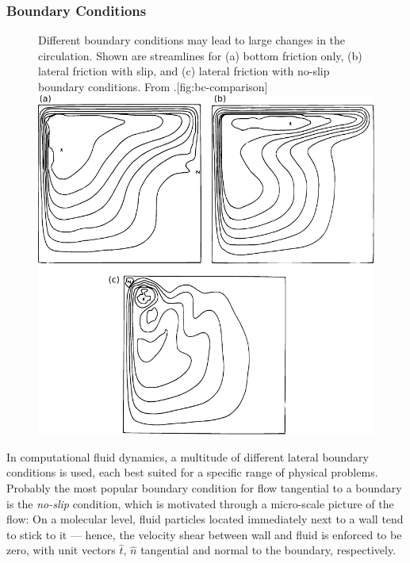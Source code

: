 \subsubsection{Boundary Conditions}
\begin{figure}
	\begin{sidecaption}{Different boundary conditions may lead to large changes in the circulation. Shown are streamlines for (a) bottom friction only, (b) lateral friction with slip, and (c) lateral friction with no-slip boundary conditions. From \cite{blandford}.}[fig:bc-comparison]
	\centering
	\includegraphics[width=.8\textwidth]{figures/physics/bc-blandford}
	\end{sidecaption}
\end{figure}

In computational fluid dynamics, a multitude of different lateral boundary conditions is used, each best suited for a specific range of physical problems. Probably the most popular boundary condition for flow tangential to a boundary is the \emph{no-slip} condition, which is motivated through a micro-scale picture of the flow: On a molecular level, fluid particles located immediately next to a wall tend to stick to it --- hence, the velocity shear between wall and fluid is enforced to be zero, \ie
%
%
with unit vectors \(\hat{t}\), \(\hat{n}\) tangential and normal to the boundary, respectively.

